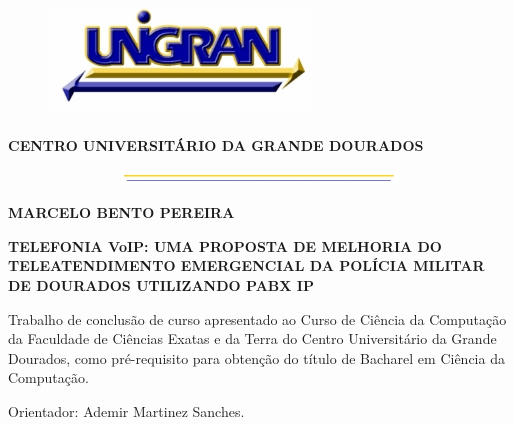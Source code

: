 \begin{center}   %

\begin{figure}[h] %
\centering        %
\includegraphics[width=7.0cm, height=3.0cm]{imagens/UNIGRAN.jpg} %
\end{figure}      %

\textbf{CENTRO UNIVERSITÁRIO DA GRANDE DOURADOS}

\begin{figure}[h]
\centering
\includegraphics[width=15.0cm, height=0.40cm]{imagens/AMARELO.jpg}
\end{figure}


\textbf{MARCELO BENTO PEREIRA}  \\ 

\vspace{4cm}

\textbf{TELEFONIA VoIP: UMA PROPOSTA DE MELHORIA DO TELEATENDIMENTO EMERGENCIAL DA POLÍCIA MILITAR DE DOURADOS UTILIZANDO PABX IP}  %

\vspace{2cm}

\begin{flushright}  %
\parbox[c]{.5\linewidth}{
            Trabalho de conclusão de curso apresentado ao Curso de Ciência da Computação da Faculdade de Ciências Exatas e da Terra do Centro Universitário da Grande Dourados, como pré-requisito para obtenção do título de Bacharel em Ciência da Computação.
            \vspace{1cm}

            Orientador: Ademir Martinez Sanches.
         }
\end{flushright}


\end{center}
